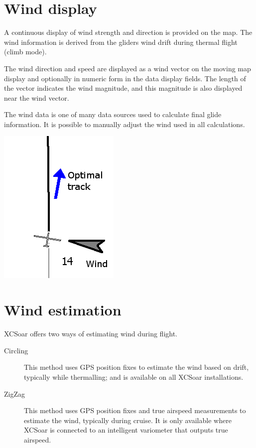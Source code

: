 \documentclass[a4paper,12pt]{refrep}
\begin{document}
\section{Wind display}

A continuous display of wind strength and direction is provided on the
map.  The wind information is derived from the gliders wind drift
during thermal flight (climb mode).

The wind direction and speed are displayed as a wind vector on the
moving map display and optionally in numeric form in the data display
fields.  The length of the vector indicates the wind magnitude, and
this magnitude is also displayed near the wind vector.

The wind data is one of many data sources used to calculate final
glide information.  It is possible to manually adjust the wind used in
all calculations.

\begin{center}
\includegraphics[angle=0,width=0.4\linewidth,keepaspectratio='true']{figures/optwind.png}


\end{center}

\section{Wind estimation}\label{sec:wind-estimation}

XCSoar offers two ways of estimating wind during flight.
\begin{description}
\item[Circling]  This method uses GPS position fixes to estimate the wind
  based on drift, typically while thermalling; and is available on all
  XCSoar installations.
\item[ZigZag]  This method uses GPS position fixes and true airspeed measurements
  to estimate the wind, typically during cruise.  It is only available where
  XCSoar is connected to an intelligent variometer that outputs true airspeed.
\end{description}
\end{document}
